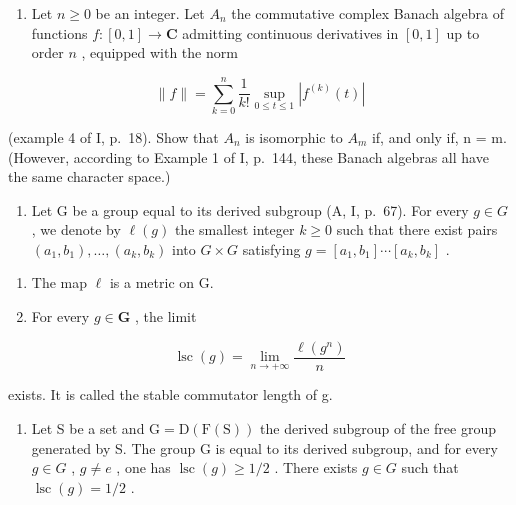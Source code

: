 \begin{enumerate}
\def\labelenumi{\arabic{enumi})}
\setcounter{enumi}{1}
\tightlist
\item
  Let \(n \geqslant 0\) be an integer. Let \(A_n\) the commutative complex Banach algebra of functions \(f: [0,1] \to \mathbf{C}\) admitting continuous derivatives in \([0,1]\) up to order \(n\) , equipped with the norm
\end{enumerate}

\[
\| f \| = \sum_ {k = 0} ^ {n} \frac {1}{k !} \sup _ {0 \leqslant t \leqslant 1} | f ^ {(k)} (t) |
\]

(example 4 of I, p.~18). Show that \(A_{n}\) is isomorphic to \(A_{m}\) if, and only if, n = m. (However, according to Example 1 of I, p.~144, these Banach algebras all have the same character space.)

\begin{enumerate}
\def\labelenumi{\arabic{enumi})}
\setcounter{enumi}{2}
\tightlist
\item
  Let G be a group equal to its derived subgroup (A, I, p.~67). For every \(g \in G\) , we denote by \(\ell(g)\) the smallest integer \(k \geqslant 0\) such that there exist pairs \((a_{1}, b_{1}), \ldots, (a_{k}, b_{k})\) into \(G \times G\) satisfying \(g = [a_{1}, b_{1}] \cdots [a_{k}, b_{k}]\) .
\end{enumerate}

\begin{enumerate}
\def\labelenumi{\alph{enumi})}
\item
  The map \(\ell\) is a metric on G.
\item
  For every \(g \in \mathbf{G}\) , the limit
\end{enumerate}

\[
\operatorname{lsc} (g) = \lim _ {n \to + \infty} \frac {\ell (g ^ {n})}{n}
\]

exists. It is called the stable commutator length of g.

\begin{enumerate}
\def\labelenumi{\alph{enumi})}
\setcounter{enumi}{2}
\tightlist
\item
  Let S be a set and \(\mathrm{G} = \mathrm{D}(\mathrm{F}(\mathrm{S}))\) the derived subgroup of the free group generated by S. The group G is equal to its derived subgroup, and for every \(g \in G\) , \(g \neq e\) , one has \(\operatorname{lsc}(g) \geqslant 1/2\) . There exists \(g \in G\) such that \(\operatorname{lsc}(g) = 1/2\) .
\end{enumerate}

